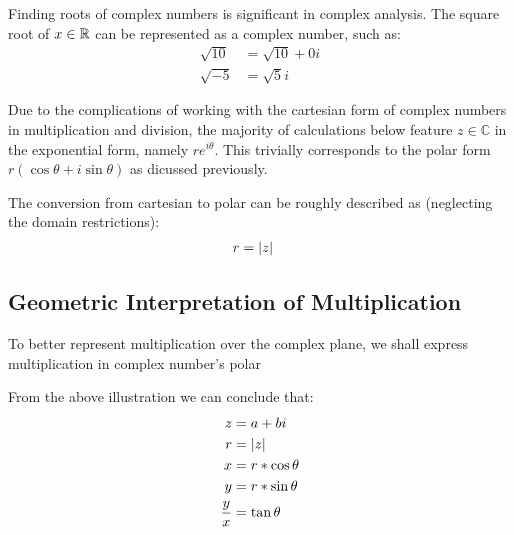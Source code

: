 \documentclass[12pt]{article}
\begin{document}
	Finding roots of complex numbers is significant in complex analysis. The square root of $x \in \mathbb{R}$ can be represented as a complex number, such as:
	\begin{align*}
		\sqrt{10} &= \sqrt{10} + 0i \\
		\sqrt{-5} &= \sqrt{5}i
	\end{align*}
	
	Due to the complications of working with the cartesian form of complex numbers in multiplication and division, the majority of calculations below feature $z \in \mathbb{C}$ in the exponential form, namely $re^{i\theta}$. This trivially corresponds to the polar form $r(\cos \theta + i\sin \theta)$ as dicussed previously.
	
	The conversion from cartesian to polar can be roughly described as (neglecting the domain restrictions):
	\begin{align*}
		r &= \lvert z \rvert
	\end{align*}
	
	\subsection{Geometric Interpretation of Multiplication}
	
	To better represent multiplication over the complex plane, we shall express multiplication in complex number's polar 
	\begin{center}
	\end{center}
	
	From the above illustration we can conclude that:
	\begin{align*}
		z &= a + bi \\
		r &= \lvert z \rvert \\
		x &= r * \cos \theta \\
		y &= r * \sin \theta \\
		\frac{y}{x} &= \tan \theta
	\end{align*}
	
\end{document}
